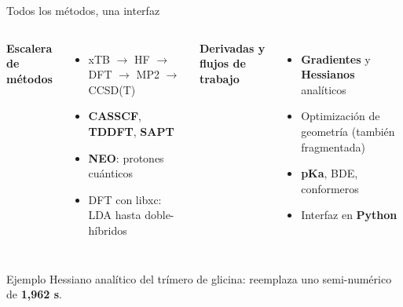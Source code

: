 \documentclass[aspectratio=169]{beamer}
\begin{document}
\begin{frame}{Todos los métodos, una interfaz}
  \begin{columns}[T,onlytextwidth]
      \textbf{Escalera de métodos}
      \begin{itemize}\setlength\itemsep{2pt}
        \item xTB $\to$ HF $\to$ DFT $\to$ MP2 $\to$ CCSD(T)
        \item \textbf{CASSCF}, \textbf{TDDFT}, \textbf{SAPT}
        \item \textbf{NEO}: protones cuánticos
        \item DFT con libxc: LDA hasta doble-híbridos
      \end{itemize}
      \textbf{Derivadas y flujos de trabajo}
      \begin{itemize}\setlength\itemsep{2pt}
        \item \textbf{Gradientes} y \textbf{Hessianos} analíticos
        \item Optimización de geometría (también fragmentada)
        \item \textbf{pKa}, BDE, conformeros
        \item Interfaz en \textbf{Python}
      \end{itemize}
  \end{columns}
  \vspace{.5em}
  \begin{exampleblock}{Ejemplo}
    Hessiano analítico del trímero de glicina: reemplaza uno semi-numérico de \textbf{1,962 s}.
  \end{exampleblock}
\end{frame}
\end{document}
